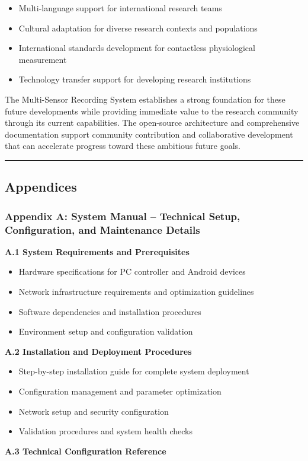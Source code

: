 \documentclass[12pt,a4paper]{report}
\begin{document}
\begin{itemize}
\item Multi-language support for international research teams
\item Cultural adaptation for diverse research contexts and populations
\item International standards development for contactless physiological measurement
\item Technology transfer support for developing research institutions

\end{itemize}
The Multi-Sensor Recording System establishes a strong foundation for these future developments while providing
immediate value to the research community through its current capabilities. The open-source architecture and
comprehensive documentation support community contribution and collaborative development that can accelerate progress
toward these ambitious future goals.

\hrule

\subsection{Appendices}

\subsubsection{Appendix A: System Manual – Technical Setup, Configuration, and Maintenance Details}

\textbf{A.1 System Requirements and Prerequisites}

\begin{itemize}
\item Hardware specifications for PC controller and Android devices
\item Network infrastructure requirements and optimization guidelines
\item Software dependencies and installation procedures
\item Environment setup and configuration validation

\end{itemize}
\textbf{A.2 Installation and Deployment Procedures}

\begin{itemize}
\item Step-by-step installation guide for complete system deployment
\item Configuration management and parameter optimization
\item Network setup and security configuration
\item Validation procedures and system health checks

\end{itemize}
\textbf{A.3 Technical Configuration Reference}
\end{document}
